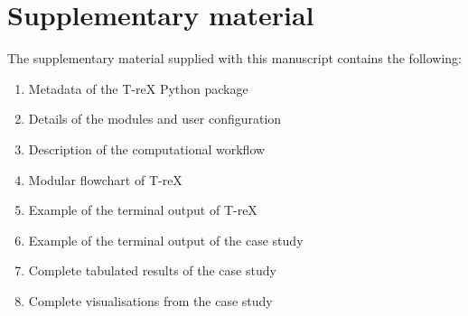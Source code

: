 \documentclass[a4paper,fleqn,longmktitle]{cas-dc}
\begin{document}
\section{Supplementary material}\label{sec:supplementary}
  The supplementary material supplied with this manuscript contains the following:
    \begin{enumerate}
        \item Metadata of the T-reX Python package
        \item Details of the modules and user configuration
        \item Description of the computational workflow
        \item Modular flowchart of T-reX
        \item Example of the terminal output of T-reX
        \item Example of the terminal output of the case study
        \item Complete tabulated results of the case study
        \item Complete visualisations from the case study
    \end{enumerate}

%



\end{document}
